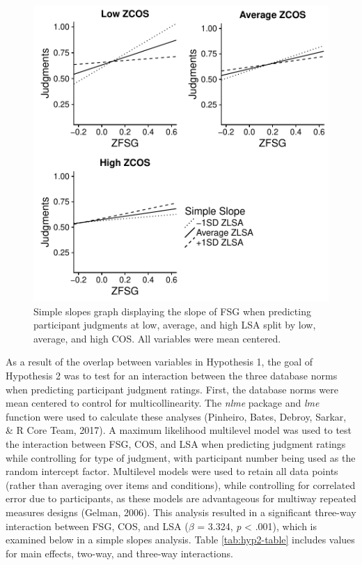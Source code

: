 \documentclass[english,man]{apa6}
\theoremstyle{definition}
\theoremstyle{definition}
\theoremstyle{remark}
\begin{document}
\begin{figure}[htbp]
\centering
\includegraphics{max_buch_JOL_files/figure-latex/hyp2graph-1.pdf}
\caption{\label{fig:hyp2graph}Simple slopes graph displaying the slope of
FSG when predicting participant judgments at low, average, and high LSA
split by low, average, and high COS. All variables were mean centered.}
\end{figure}

As a result of the overlap between variables in Hypothesis 1, the goal
of Hypothesis 2 was to test for an interaction between the three
database norms when predicting participant judgment ratings. First, the
database norms were mean centered to control for multicollinearity. The
\emph{nlme} package and \emph{lme} function were used to calculate these
analyses (Pinheiro, Bates, Debroy, Sarkar, \& R Core Team, 2017). A
maximum likelihood multilevel model was used to test the interaction
between FSG, COS, and LSA when predicting judgment ratings while
controlling for type of judgment, with participant number being used as
the random intercept factor. Multilevel models were used to retain all
data points (rather than averaging over items and conditions), while
controlling for correlated error due to participants, as these models
are advantageous for multiway repeated measures designs (Gelman, 2006).
This analysis resulted in a significant three-way interaction between
FSG, COS, and LSA (\(\beta\) = 3.324, \emph{p} \textless{} .001), which
is examined below in a simple slopes analysis. Table
\ref{tab:hyp2-table} includes values for main effects, two-way, and
three-way interactions.
\end{document}
